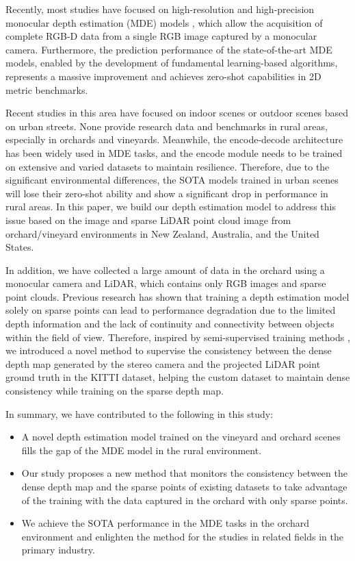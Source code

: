 \documentclass{article}
\begin{document}
    Recently, most studies have focused on high-resolution and high-precision monocular depth estimation (MDE) models \cite{li2023patchfusion,depth_anything_v1,depth_anything_v2}, which allow the acquisition of complete RGB-D data from a single RGB image captured by a monocular camera. Furthermore, the prediction performance of the state-of-the-art MDE models, enabled by the development of fundamental learning-based algorithms, represents a massive improvement and achieves zero-shot capabilities in 2D metric benchmarks.

    Recent studies in this area have focused on indoor scenes \cite{nyudepthv2} or outdoor scenes \cite{Cordts2016Cityscapes,kitti,waymo,nuscenes} based on urban streets. None provide research data and benchmarks in rural areas, especially in orchards and vineyards. Meanwhile, the encode-decode architecture has been widely used in MDE tasks, and the encode module needs to be trained on extensive and varied datasets to maintain resilience. Therefore, due to the significant environmental differences, the SOTA models trained in urban scenes will lose their zero-shot ability and show a significant drop in performance in rural areas. In this paper, we build our depth estimation model to address this issue based on the image and sparse LiDAR point cloud image from orchard/vineyard environments in New Zealand, Australia, and the United States. 

    In addition, we have collected a large amount of data in the orchard using a monocular camera and LiDAR, which contains only RGB images and sparse point clouds. Previous research has shown that training a depth estimation model solely on sparse points can lead to performance degradation due to the limited depth information and the lack of continuity and connectivity between objects within the field of view. Therefore, inspired by semi-supervised training methods \cite{crossconsistency}, we introduced a novel method to supervise the consistency between the dense depth map generated by the stereo camera and the projected LiDAR point ground truth in the KITTI \cite{kittdepthbenchmard} dataset, helping the custom dataset to maintain dense consistency while training on the sparse depth map.

    In summary, we have contributed to the following in this study:
    \begin{itemize}
        \item A novel depth estimation model trained on the vineyard and orchard scenes fills the gap of the MDE model in the rural environment.
        \item Our study proposes a new method that monitors the consistency between the dense depth map and the sparse points of existing datasets to take advantage of the training with the data captured in the orchard with only sparse points.
        \item We achieve the SOTA performance in the MDE tasks in the orchard environment and enlighten the method for the studies in related fields in the primary industry.
    \end{itemize}
    
\end{document}
